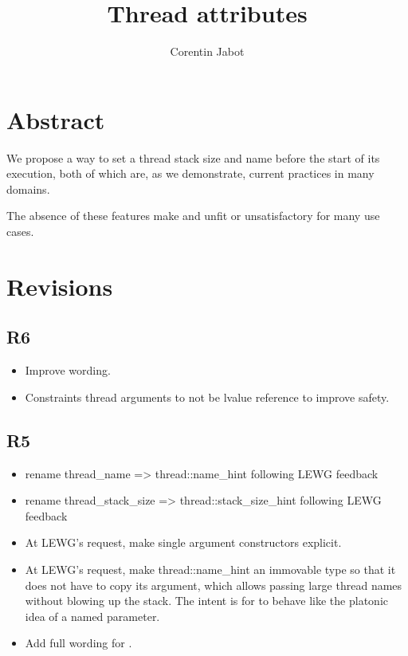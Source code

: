 \documentclass{wg21}
\title{Thread attributes}
\author{Corentin Jabot}{corentin.jabot@gmail.com}
\begin{document}
\maketitle

\setlength{\arrayrulewidth}{0.2mm}
\setlength{\tabcolsep}{8pt}
\renewcommand{\arraystretch}{1.}

\def\changemargin#1#2{\list{}{\rightmargin#2\leftmargin#1}\item[]}
\let\endchangemargin=\endlist
\setlength\extrarowheight{5pt}


\section{Abstract}

We propose a way to set a thread stack size and name before the start of its execution, both of which are,
as we demonstrate, current practices in many domains.

The absence of these features make  and  unfit or unsatisfactory for many use cases.

\section{Revisions}

\subsection{R6}

\begin{itemize}
\item Improve wording.
\item Constraints thread arguments to not be lvalue reference to improve safety.
\end{itemize}

\subsection{R5}

\begin{itemize}
\item rename thread_name => thread::name_hint following LEWG feedback
\item rename thread_stack_size => thread::stack_size_hint following LEWG feedback
\item At LEWG's request, make single argument constructors explicit.
\item At LEWG's request, make thread::name_hint an immovable type so that it does not have to copy its argument, which allows passing large thread names without blowing up the stack.
      The intent is for  to behave like the platonic idea of a named parameter.
\item Add full wording for .
\end{itemize}
\end{document}
